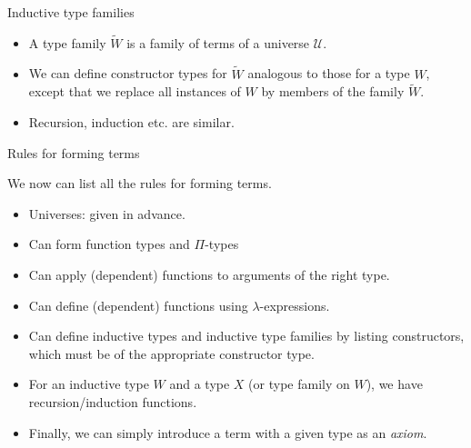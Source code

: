 \documentclass[10 pt., handout]{beamer}
\theoremstyle{plain}
\theoremstyle{remark}
\newcommand{\U}{\mathcal{U}}
\begin{document}
\begin{frame}{Inductive type families}

\begin{itemize}

\item A type family $\tilde{W}$ is a family of terms of a universe $\U$.

\item We can define constructor types for $\tilde{W}$ analogous to those for a type $W$, except that we replace all instances of $W$ by members of the family $\tilde{W}$.

\item Recursion, induction etc. are similar.

\end{itemize}

\end{frame}



\begin{frame}{Rules for forming terms}

We now can list all the rules for forming terms.

\begin{itemize}

\item Universes: given in advance.

\item Can form function types and $\Pi$-types

\item Can apply (dependent) functions to arguments of the right type.

\item Can define (dependent) functions using $\lambda$-expressions.

\item Can define inductive types and inductive type families by listing constructors, which must be of the appropriate constructor type.

\item For an inductive type $W$ and a type $X$ (or type family on $W$), we have recursion/induction functions.

\item Finally, we can simply introduce a term with a given type as an \emph{axiom}.

\end{itemize}

\end{frame}
\end{document}
